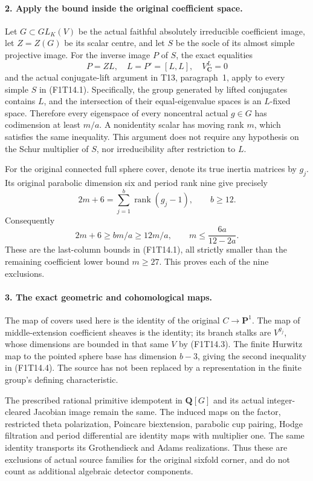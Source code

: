 \paragraph{2. Apply the bound inside the original coefficient space.}
Let \(G\subset GL_K(V)\) be the actual faithful absolutely
irreducible coefficient image, let \(Z=Z(G)\) be its scalar
centre, and let \(S\) be the socle of its almost simple
projective image. For the inverse image \(P\) of \(S\),
the exact equalities
\[
 P=ZL,\quad L=P'=[L,L],\quad V_{\mathbf C}^L=0
 \tag{F1T14.3}
\]
and the actual conjugate-lift argument in T13, paragraph~1,
apply to every simple \(S\) in (F1T14.1). Specifically,
the group generated by lifted conjugates contains \(L\),
and the intersection of their equal-eigenvalue spaces is
an \(L\)-fixed space. Therefore every eigenspace of every
noncentral actual \(g\in G\) has codimension at least
\(m/a\). A nonidentity scalar has moving rank \(m\),
which satisfies the same inequality. This argument does
not require any hypothesis on the Schur multiplier of
\(S\), nor irreducibility after restriction to \(L\).

For the original connected full sphere cover, denote its
true inertia matrices by \(g_j\). Its original parabolic
dimension six and period rank nine give precisely
\[
 2m+6=\sum_{j=1}^b\operatorname{rank}(g_j-1),\qquad
 b\ge12.
 \tag{F1T14.4}
\]
Consequently
\[
 2m+6\ge bm/a\ge12m/a,
 \qquad m\le\frac{6a}{12-2a}.
 \tag{F1T14.5}
\]
These are the last-column bounds in (F1T14.1), all strictly
smaller than the remaining coefficient lower bound
\(m\ge27\). This proves each of the nine exclusions.

\paragraph{3. The exact geometric and cohomological maps.}
The map of covers used here is the identity of the original
\(C\to\mathbf P^1\). The map of middle-extension coefficient
sheaves is the identity; its branch stalks are
\(V^{g_j}\), whose dimensions are bounded in that same
\(V\) by (F1T14.3). The finite Hurwitz map to the pointed
sphere base has dimension \(b-3\), giving the second
inequality in (F1T14.4). The source has not been replaced
by a representation in the finite group's defining
characteristic.

The prescribed rational primitive idempotent in
\(\mathbf Q[G]\) and its actual integer-cleared Jacobian
image remain the same. The induced maps on the factor,
restricted theta polarization, Poincare biextension,
parabolic cup pairing, Hodge filtration and period
differential are identity maps with multiplier one.
The same identity transports its Grothendieck and Adams
realizations. Thus these are exclusions of actual source
families for the original sixfold corner, and do not count
as additional algebraic detector components.
